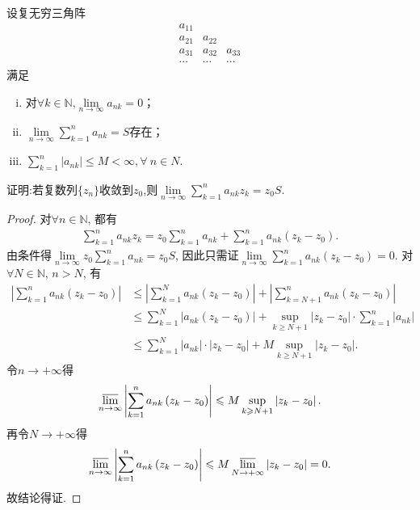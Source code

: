\documentclass[../../main.tex]{subfiles}%
\begin{document}
\begin{theorem}[Toplitz定理]\label{theorem:复变版本-Toplitz定理}
设复无穷三角阵
\[
\begin{array}{ccc} 
a_{11} \\
a_{21} & a_{22} \\
a_{31} & a_{32} & a_{33} \\
\cdots & \cdots & \cdots
\end{array}
\]
满足
\begin{enumerate}[(i)]
\item 对$\forall k\in \mathbb{N}$,$\lim\limits_{n\rightarrow \infty}a_{nk}=0$；

\item $\lim\limits_{n\rightarrow \infty}\sum\limits_{k=1}^n a_{nk}=S$存在；

\item $\sum\limits_{k=1}^n |a_{nk}| \leqslant M < \infty,\forall\ n \in N$.
\end{enumerate}
证明:若复数列$\{z_n\}$收敛到$z_0$,则$\lim\limits_{n\rightarrow \infty}\sum\limits_{k=1}^n a_{nk}z_k=z_0S$.
\end{theorem}
\begin{proof}

对$\forall n\in \mathbb{N}$, 都有
\begin{align*}
\sum_{k=1}^n{a_{nk}z_k}=z_0\sum_{k=1}^n{a_{nk}}+\sum_{k=1}^n{a_{nk}\left( z_k-z_0 \right)}.
\end{align*}
由条件得$\lim\limits_{n\rightarrow \infty}z_0\sum_{k=1}^n{a_{nk}}=z_0S$, 因此只需证$\lim\limits_{n\rightarrow \infty}\sum_{k=1}^n{a_{nk}\left( z_k-z_0 \right)}=0$. 对$\forall N\in \mathbb{N}$, $n>N$, 有
\begin{align*}
\left| \sum_{k=1}^n{a_{nk}\left( z_k-z_0 \right)} \right|&\leqslant \left| \sum_{k=1}^N{a_{nk}\left( z_k-z_0 \right)} \right|+\left| \sum_{k=N+1}^n{a_{nk}\left( z_k-z_0 \right)} \right|
\\
&\leqslant \sum_{k=1}^N{\left| a_{nk}\left( z_k-z_0 \right) \right|}+\sup\limits_{k\geqslant N+1}\left| z_k-z_0 \right|\cdot \sum_{k=1}^n{\left| a_{nk} \right|}
\\
&\leqslant \sum_{k=1}^N{\left| a_{nk} \right|\cdot \left| z_k-z_0 \right|}+M\sup\limits_{k\geqslant N+1}\left| z_k-z_0 \right|.
\end{align*}
令$n\rightarrow +\infty$得
\begin{align*}
\varlimsup\limits_{n\rightarrow \infty}\left| \sum_{k=1}^n{a_{nk}\left( z_k-z_0 \right)} \right|\leqslant M\sup\limits_{k\geqslant N+1}\left| z_k-z_0 \right|.
\end{align*}
再令$N\rightarrow +\infty$得
\begin{align*}
\varlimsup\limits_{n\rightarrow \infty}\left| \sum_{k=1}^n{a_{nk}\left( z_k-z_0 \right)} \right|\leqslant M\varlimsup\limits_{N\rightarrow +\infty}\left| z_k-z_0 \right|=0.
\end{align*}
故结论得证.

\end{proof}
\end{document}
